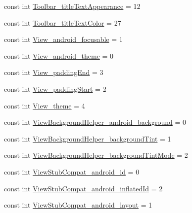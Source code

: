 \begin{DoxyCompactItemize}
\item 
const int \mbox{\hyperlink{class_f_w_p_s___app_1_1_droid_1_1_resource_1_1_styleable_a8af061c918705dbd633e239df29e17b5}{Toolbar\+\_\+title\+Text\+Appearance}} = 12
\item 
const int \mbox{\hyperlink{class_f_w_p_s___app_1_1_droid_1_1_resource_1_1_styleable_aa3d411a22027e13773e4192bf353144a}{Toolbar\+\_\+title\+Text\+Color}} = 27
\item 
const int \mbox{\hyperlink{class_f_w_p_s___app_1_1_droid_1_1_resource_1_1_styleable_aff3a851b6fd3dc8af8a8453fe3ec3074}{View\+\_\+android\+\_\+focusable}} = 1
\item 
const int \mbox{\hyperlink{class_f_w_p_s___app_1_1_droid_1_1_resource_1_1_styleable_ae51b21e1c70ebaa50bd3e7741bdd6d91}{View\+\_\+android\+\_\+theme}} = 0
\item 
const int \mbox{\hyperlink{class_f_w_p_s___app_1_1_droid_1_1_resource_1_1_styleable_a50efa720badc55988e95170ced1cfb21}{View\+\_\+padding\+End}} = 3
\item 
const int \mbox{\hyperlink{class_f_w_p_s___app_1_1_droid_1_1_resource_1_1_styleable_a38eb72cf568c4bf5b08c132389889e26}{View\+\_\+padding\+Start}} = 2
\item 
const int \mbox{\hyperlink{class_f_w_p_s___app_1_1_droid_1_1_resource_1_1_styleable_a1a9018db0b9c996bb696abefdb1d4207}{View\+\_\+theme}} = 4
\item 
const int \mbox{\hyperlink{class_f_w_p_s___app_1_1_droid_1_1_resource_1_1_styleable_abc1a90b5264e026f8f2f0eb9668f05d4}{View\+Background\+Helper\+\_\+android\+\_\+background}} = 0
\item 
const int \mbox{\hyperlink{class_f_w_p_s___app_1_1_droid_1_1_resource_1_1_styleable_a3decea781e2898c75314e448e712bd27}{View\+Background\+Helper\+\_\+background\+Tint}} = 1
\item 
const int \mbox{\hyperlink{class_f_w_p_s___app_1_1_droid_1_1_resource_1_1_styleable_afcbf8f6cfef8fbb7205c86d4625eb84f}{View\+Background\+Helper\+\_\+background\+Tint\+Mode}} = 2
\item 
const int \mbox{\hyperlink{class_f_w_p_s___app_1_1_droid_1_1_resource_1_1_styleable_a1cabe5772c6e6ce35806ec8eb7103188}{View\+Stub\+Compat\+\_\+android\+\_\+id}} = 0
\item 
const int \mbox{\hyperlink{class_f_w_p_s___app_1_1_droid_1_1_resource_1_1_styleable_aa04a7ec8903e1ba351d961d149520887}{View\+Stub\+Compat\+\_\+android\+\_\+inflated\+Id}} = 2
\item 
const int \mbox{\hyperlink{class_f_w_p_s___app_1_1_droid_1_1_resource_1_1_styleable_a9a3fef737584270c180501c8889a112d}{View\+Stub\+Compat\+\_\+android\+\_\+layout}} = 1
\end{DoxyCompactItemize}
